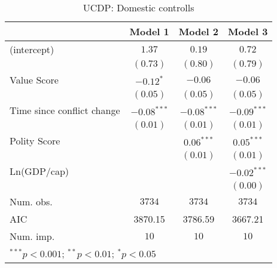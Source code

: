 
\begin{table}
\begin{center}
\begin{tabular}{l c c c}
\toprule
 & Model 1 & Model 2 & Model 3 \\
\midrule
(intercept)                & $1.37$        & $0.19$        & $0.72$        \\
                           & $(0.73)$      & $(0.80)$      & $(0.79)$      \\
Value Score                & $-0.12^{*}$   & $-0.06$       & $-0.06$       \\
                           & $(0.05)$      & $(0.05)$      & $(0.05)$      \\
Time since conflict change & $-0.08^{***}$ & $-0.08^{***}$ & $-0.09^{***}$ \\
                           & $(0.01)$      & $(0.01)$      & $(0.01)$      \\
Polity Score               &               & $0.06^{***}$  & $0.05^{***}$  \\
                           &               & $(0.01)$      & $(0.01)$      \\
Ln(GDP/cap)                &               &               & $-0.02^{***}$ \\
                           &               &               & $(0.00)$      \\
\midrule
Num. obs.                  & $3734$        & $3734$        & $3734$        \\
AIC                        & 3870.15       & 3786.59       & 3667.21       \\
Num. imp.                  & $10$          & $10$          & $10$          \\
\bottomrule
\multicolumn{4}{l}{\scriptsize{$^{***}p<0.001$; $^{**}p<0.01$; $^{*}p<0.05$}}
\end{tabular}
\caption{UCDP: Domestic controlls}
\label{UCDP_1}
\end{center}
\end{table}

